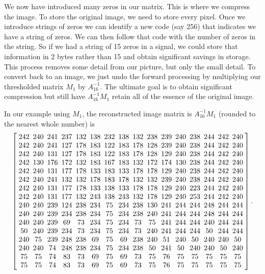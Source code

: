 We now have introduced many zeros in our matrix. This is where we compress the image. To store the original image, we need to store every pixel. Once we introduce strings of zeros we can identify a new code (say 256) that indicates we have a string of zeros. We can then follow that code with the number of zeros in the string. So if we had a string of 15 zeros in a signal, we could store that information in 2 bytes rather than 15 and obtain significant savings in storage. This process removes some detail from our picture, but only the small detail. To convert back to an image, we just undo the forward processing by multiplying our thresholded matrix $M_1$ by $A_{16}^{-1}$. The ultimate goal is to obtain significant compression but still have $A_{16}^{-1}M_1$ retain all of the essence of the original image. 

In our example using $M_1$, the reconstructed image matrix is $A_{16}^{-1}M_1$ (rounded to the nearest whole number) is 
\[ \left[\arraycolsep=2.5pt  \begin {array}{cccccccccccccccc}  242& 240& 241& 237&
 132& 138& 232& 138& 132& 238& 239& 240& 238& 244&
 242& 240\\ 242& 240& 241& 127& 178&
 183& 122& 183& 178& 128& 239& 240& 238& 244& 242&
 240\\ 242& 240& 131& 127& 178& 183&
 122& 183& 178& 128& 129& 240& 238& 244& 242& 240
\\ 242& 130& 176& 172& 132& 183& 167&
 183& 132& 172& 174& 130& 238& 244& 242& 240
\\ 242& 240& 131& 177& 178& 133& 183&
 133& 178& 178& 129& 240& 238& 244& 242& 240
\\ 242& 240& 241& 132& 132& 178& 183&
 178& 132& 132& 239& 240& 238& 244& 242& 240
\\ 242& 240& 131& 177& 178& 133& 138&
 133& 178& 178& 129& 240& 223& 244& 242& 240
\\ 242& 240& 131& 177& 132& 243& 138&
 243& 132& 178& 129& 240& 253& 244& 242& 240
\\ 240& 240& 239& 124& 238& 234& 75&
 234& 238& 130& 241& 244& 244& 248& 244& 244
\\ 240& 240& 239& 234& 238& 234& 75&
 234& 238& 240& 241& 244& 244& 248& 244& 244
\\ 240& 240& 239& 69& 73& 234& 75&
 234& 73& 75& 241& 244& 244& 240& 244& 244
\\ 50& 240& 239& 234& 73& 234& 75&
 234& 73& 240& 241& 244& 244& 50& 244& 244
\\ 240& 75& 239& 248& 238& 69& 75&
 69& 238& 240& 51& 240& 50& 240& 240& 50
\\ 240& 240& 74& 248& 238& 234& 75&
 234& 238& 50& 241& 50& 240& 240& 50& 240
\\ 75& 75& 74& 83& 73& 69& 75& 69&
 73& 75& 76& 75& 75& 75& 75& 75\\
 75& 75& 74& 83& 73& 69& 75& 69& 73& 75& 76&
 75& 75& 75& 75& 75\end {array}  \right].\]


